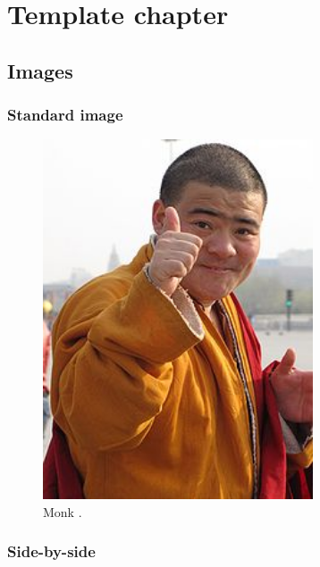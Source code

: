 \chapter{Template chapter}

\label{ChapterTemplate} %

\section{Images}

\subsection{Standard image}

\begin{figure}[H]
\centering
\includegraphics[width=8cm]{Figures/yeh_monk.jpg}
\decoRule
\caption[img-name]{Monk \parencite{cf_1.2_eigentaste}.}
\label{fig:monkeh}
\end{figure}

\subsection{Side-by-side}

